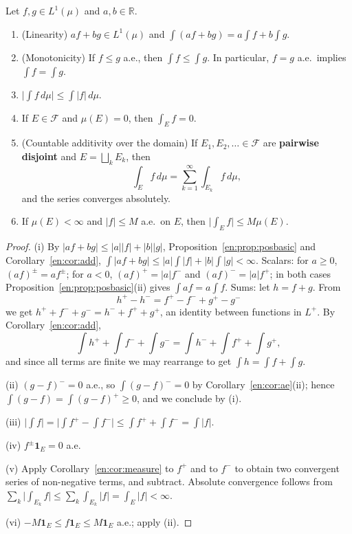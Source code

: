 \documentclass[11pt]{article}
\makeatletter
\newcommand{\envlabel}[1]{\protected@edef\@currentlabel{\themathenv}\label{#1}}
\makeatother
\begin{document}
\begin{theorem}\envlabel{en:thm:basic}
Let $f,g\in L^{1}(\mu)$ and $a,b\in\mathbb{R}$.
\begin{enumerate}
  \item (Linearity) $af+bg\in L^{1}(\mu)$ and $\int(af+bg)=a\int f+b\int g$.
  \item (Monotonicity) If $f\leq g$ a.e., then $\int f\leq\int g$. In particular, $f=g$ a.e.\ implies $\int f=\int g$.
  \item $\big|\int f\,d\mu\big|\leq\int|f|\,d\mu$.
  \item If $E\in\mathcal{F}$ and $\mu(E)=0$, then $\int_{E}f=0$.
  \item (Countable additivity over the domain) If $E_{1},E_{2},\ldots\in\mathcal{F}$ are \textbf{pairwise disjoint} and $E=\bigsqcup_{k}E_{k}$, then
  \[
  \int_{E}f\,d\mu=\sum_{k=1}^{\infty}\int_{E_{k}}f\,d\mu,
  \]
  and the series converges absolutely.
  \item If $\mu(E)<\infty$ and $|f|\leq M$ a.e.\ on $E$, then $\big|\int_{E}f\big|\leq M\mu(E)$.
\end{enumerate}
\end{theorem}

\begin{proof}
(i) By $|af+bg|\leq|a||f|+|b||g|$, Proposition~\ref{en:prop:posbasic} and Corollary~\ref{en:cor:add}, $\int|af+bg|\leq|a|\int|f|+|b|\int|g|<\infty$. Scalars: for $a\geq0$, $(af)^{\pm}=af^{\pm}$; for $a<0$, $(af)^{+}=|a|f^{-}$ and $(af)^{-}=|a|f^{+}$; in both cases Proposition~\ref{en:prop:posbasic}(ii) gives $\int af=a\int f$. Sums: let $h=f+g$. From
\[
h^{+}-h^{-}=f^{+}-f^{-}+g^{+}-g^{-}
\]
we get $h^{+}+f^{-}+g^{-}=h^{-}+f^{+}+g^{+}$, an identity between functions in $L^{+}$. By Corollary~\ref{en:cor:add},
\[
\int h^{+}+\int f^{-}+\int g^{-}=\int h^{-}+\int f^{+}+\int g^{+},
\]
and since all terms are finite we may rearrange to get $\int h=\int f+\int g$.

(ii) $(g-f)^{-}=0$ a.e., so $\int(g-f)^{-}=0$ by Corollary~\ref{en:cor:ae}(ii); hence $\int(g-f)=\int(g-f)^{+}\geq0$, and we conclude by (i).

(iii) $\big|\int f\big|=\big|\int f^{+}-\int f^{-}\big|\leq\int f^{+}+\int f^{-}=\int|f|$.

(iv) $f^{\pm}\mathbf{1}_{E}=0$ a.e.

(v) Apply Corollary~\ref{en:cor:measure} to $f^{+}$ and to $f^{-}$ to obtain two convergent series of non-negative terms, and subtract. Absolute convergence follows from $\sum_{k}\big|\int_{E_{k}}f\big|\leq\sum_{k}\int_{E_{k}}|f|=\int_{E}|f|<\infty$.

(vi) $-M\mathbf{1}_{E}\leq f\mathbf{1}_{E}\leq M\mathbf{1}_{E}$ a.e.; apply (ii).
\end{proof}
\end{document}
